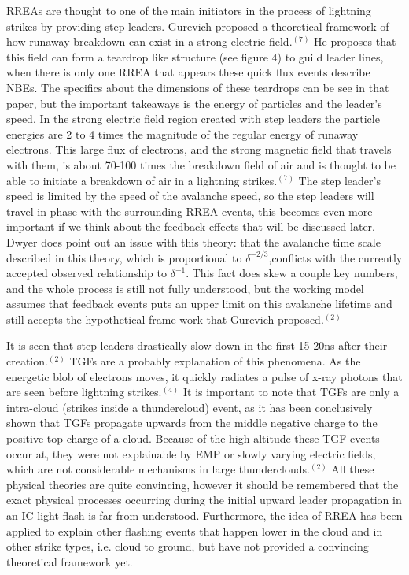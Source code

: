 \documentclass[11pt]{article}
\begin{document}
\begin{multicols*}{2}
    RREAs are thought to one of the main initiators in the process of lightning strikes by providing step leaders. Gurevich proposed a theoretical framework of how runaway breakdown can exist in a strong electric field.$^{(7)}$  He proposes that this field can form a teardrop like structure (see figure 4) to guild leader lines, when there is only one RREA that appears these quick flux events describe NBEs. The specifics about the dimensions of these teardrops can be see in that paper, but the important takeaways is the energy of particles and the leader's speed. In the strong electric field region created with step leaders the particle energies are 2 to 4 times the magnitude of the regular energy of runaway electrons. This large flux of electrons, and the strong magnetic field that travels with them, is about 70-100 times the breakdown field of air and is thought to be able to initiate a breakdown of air in a lightning strikes.${^{(7)}}$ The step leader's speed is limited by the speed of the avalanche speed, so the step leaders will travel in phase with the surrounding RREA events, this becomes even more important if we think about the feedback effects that will be discussed later. Dwyer does point out an issue with this theory: that the avalanche time scale described in this theory, which is proportional to $\delta^{-2/3}$,conflicts with the currently accepted observed relationship to $\delta^{-1}$. This fact does skew a couple key numbers, and the whole process is still not fully understood, but the working model assumes that feedback events puts an upper limit on this avalanche lifetime and still accepts the hypothetical frame work that Gurevich proposed.$^{(2)}$
    
    It is seen that step leaders drastically slow down in the first 15-20ns after their creation.$^{(2)}$ TGFs are a probably explanation of this phenomena. As the energetic blob of electrons moves, it quickly radiates a pulse of x-ray photons that are seen before lightning strikes.$^{(4)}$ It is important to note that TGFs are only a intra-cloud (strikes inside a thundercloud) event, as it has been conclusively shown that TGFs propagate upwards from the middle negative charge to the positive top charge of a cloud. Because of the high altitude these TGF events occur at, they were not explainable by EMP or slowly varying electric fields, which are not considerable mechanisms in large thunderclouds.$^{(2)}$ All these physical theories are quite convincing, however it should be remembered that the exact physical processes occurring during the initial upward leader propagation in an IC light flash is far from understood. Furthermore, the idea of RREA has been applied to explain other flashing events that happen lower in the cloud and in other strike types, i.e. cloud to ground, but have not provided a convincing theoretical framework yet.
    \newline



\end{multicols*}
\end{document}
